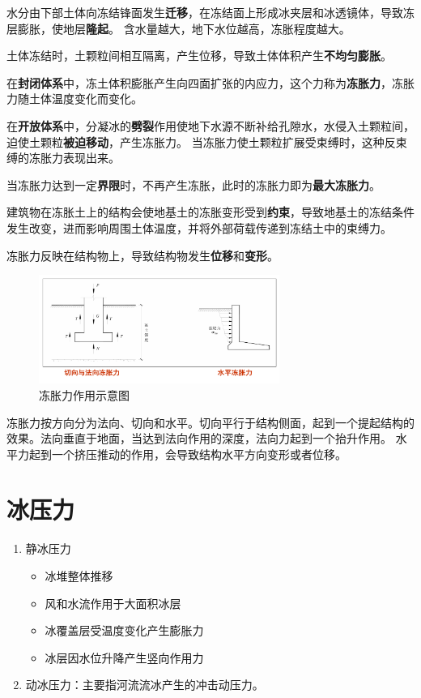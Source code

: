 \documentclass[12pt, a4paper, oneside, UTF8]{ctexbook}
\begin{document}
水分由下部土体向冻结锋面发生\textbf{迁移}，在冻结面上形成冰夹层和冰透镜体，导致冻层膨胀，使地层\textbf{隆起}。  
含水量越大，地下水位越高，冻胀程度越大。

土体冻结时，土颗粒间相互隔离，产生位移，导致土体体积产生\textbf{不均匀膨胀}。

在\textbf{封闭体系}中，冻土体积膨胀产生向四面扩张的内应力，这个力称为\textbf{冻胀力}，冻胀力随土体温度变化而变化。

在\textbf{开放体系}中，分凝冰的\textbf{劈裂}作用使地下水源不断补给孔隙水，水侵入土颗粒间，迫使土颗粒\textbf{被迫移动}，产生冻胀力。  
当冻胀力使土颗粒扩展受束缚时，这种反束缚的冻胀力表现出来。

当冻胀力达到一定\textbf{界限}时，不再产生冻胀，此时的冻胀力即为\textbf{最大冻胀力}。

建筑物在冻胀土上的结构会使地基土的冻胀变形受到\textbf{约束}，导致地基土的冻结条件发生改变，进而影响周围土体温度，并将外部荷载传递到冻结土中的束缚力。

冻胀力反映在结构物上，导致结构物发生\textbf{位移}和\textbf{变形}。

\begin{figure}[H]
    \centering
    \includegraphics[width=0.7\textwidth]{../figure/1.png}
    \caption{冻胀力作用示意图}
\end{figure}

冻胀力按方向分为法向、切向和水平。切向平行于结构侧面，起到一个提起结构的效果。法向垂直于地面，当达到法向作用的深度，法向力起到一个抬升作用。
水平力起到一个挤压推动的作用，会导致结构水平方向变形或者位移。

\section{冰压力}
\begin{enumerate}
    \item 静冰压力
    \begin{itemize}
        \item 冰堆整体推移
        \item 风和水流作用于大面积冰层
        \item 冰覆盖层受温度变化产生膨胀力
        \item 冰层因水位升降产生竖向作用力
    \end{itemize}

    \item 动冰压力：主要指河流流冰产生的冲击动压力。
\end{enumerate}
\end{document}
